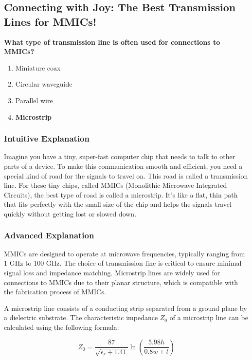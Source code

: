\subsection{Connecting with Joy: The Best Transmission Lines for MMICs!}
\label{sec:E6E07}

\begin{tcolorbox}[colback=gray!10!white,colframe=black!75!black,title={\textbf{E6E07}}]
\textbf{What type of transmission line is often used for connections to MMICs?}
\begin{enumerate}[label=\Alph*)]
    \item Miniature coax
    \item Circular waveguide
    \item Parallel wire
    \item \textbf{Microstrip}
\end{enumerate}
\end{tcolorbox}

\subsubsection{Intuitive Explanation}
Imagine you have a tiny, super-fast computer chip that needs to talk to other parts of a device. To make this communication smooth and efficient, you need a special kind of road for the signals to travel on. This road is called a transmission line. For these tiny chips, called MMICs (Monolithic Microwave Integrated Circuits), the best type of road is called a microstrip. It's like a flat, thin path that fits perfectly with the small size of the chip and helps the signals travel quickly without getting lost or slowed down.

\subsubsection{Advanced Explanation}
MMICs are designed to operate at microwave frequencies, typically ranging from 1 GHz to 100 GHz. The choice of transmission line is critical to ensure minimal signal loss and impedance matching. Microstrip lines are widely used for connections to MMICs due to their planar structure, which is compatible with the fabrication process of MMICs. 

A microstrip line consists of a conducting strip separated from a ground plane by a dielectric substrate. The characteristic impedance \( Z_0 \) of a microstrip line can be calculated using the following formula:

\[
Z_0 = \frac{87}{\sqrt{\epsilon_r + 1.41}} \ln\left(\frac{5.98h}{0.8w + t}\right)
\]

